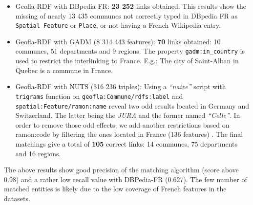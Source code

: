 \begin{itemize}
 \item Geofla-RDF with DBpedia FR: \textbf{23 252} links obtained. This results show the missing of nearly 13 435 communes not correctly typed in DBpedia FR as \texttt{Spatial Feature} or \texttt{Place}, or not having a French Wikipedia entry.
 \item Geofla-RDF with GADM (8 314 443 features): \textbf{70} links obtained: 10 communes, 51 departments and 9 regions. The property \texttt{gadm:in\_country} is used to restrict the interlinking to France. E.g.: The city of Saint-Alban in Quebec is a commune in France.
 \item Geofla-RDF with NUTS (316 236 triples): Using a \textit{``naive''} script with \texttt{trigrams} function on \texttt{geofla:Commune/rdfs:label} and \texttt{spatial:Feature/ramon:name} reveal two odd results located in Germany and Switzerland. The latter being the \textit{JURA } and the former named \textit{``Celle''}.  In order to remove those odd effects, we add another restrictions based on \textsf{ramon:code} by filtering the ones located in France (136 features) . The final matchings give a total of \textbf{105} correct links: 14 communes, 75 departments and 16 regions.
\end{itemize}

The above results show good precision of the matching algorithm (score above 0.98) and a rather low recall value with DBPedia-FR (0.627). The few number of matched entities is likely due to the low coverage of French features  in the datasets. 


\begin{table}[!htbp]
\end{table}



